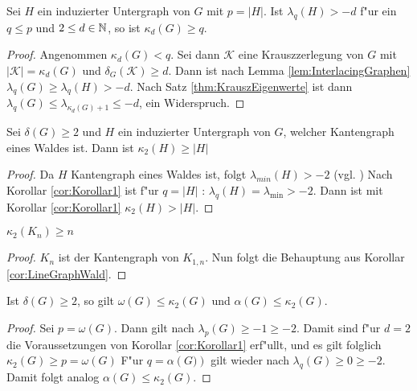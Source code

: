 \begin{corollary}
  \label{cor:Korollar1}
  Sei $H$ ein induzierter Untergraph von $G$ mit $p = \left| H\right|$.
  Ist $\lambda_q (H) > -d $ f"ur ein $q \leq p$ und $2 \leq d \in {\mathbb{N}}$, so ist $\kappa_d(G) \geq q$.
\end{corollary}
\begin{proof}
  Angenommen $\kappa_{d}(G) < q$. Sei dann $\mathcal{K}$ eine Krauszzerlegung von $G$ mit $|\mathcal{K}| = \kappa_{d}(G)$ und $\delta_G(\mathcal{K}) \geq d$. Dann ist nach Lemma \ref{lem:InterlacingGraphen} $\lambda_{q}(G) \geq \lambda_{q}(H) > -d $. Nach Satz \ref{thm:KrauszEigenwerte} ist dann $\lambda_{q}(G) \leq \lambda_{\kappa_{d}(G)+1} \leq -d $, ein Widerspruch. 
\end{proof}

\begin{corollary}
  \label{cor:LineGraphWald}
  Sei $\delta(G) \geq 2$ und $H$ ein induzierter Untergraph von $G$, welcher Kantengraph eines Waldes ist. 
  Dann ist $\kappa_{2}(H)\geq \left|H\right|$
\end{corollary}

\begin{proof}
  Da $H$ Kantengraph eines Waldes ist, folgt $\lambda_{min}(H) > -2$ (vgl. \cite[3.4.10]{zbMATH05625877}) 
  Nach Korollar \ref{cor:Korollar1} ist f"ur $q=\left|H\right|$ : $\lambda_q(H)=\lambda_{\text{min}}> -2$. Dann ist mit Korollar \ref{cor:Korollar1} $\kappa_{2}\left( H \right) > \left| H\right|$.
\end{proof}

\begin{corollary}[Klotz]
  $\kappa_{2}\left( K_n \right) \geq n$
\end{corollary}

\begin{proof}
  $K_n$ ist der Kantengraph von $K_{1,n}$. Nun folgt die Behauptung aus Korollar \ref{cor:LineGraphWald}.
\end{proof}
\begin{corollary}
  Ist $\delta\left( G \right) \geq 2$, so gilt $\omega\left( G \right)\leq \kappa_{2}\left( G \right)$ und $\alpha\left( G \right)\leq \kappa_{2}\left( G \right)$.
  \label{cor:alphaomegakrausz}
\end{corollary}

\begin{proof}
  Sei $p = \omega(G)$. Dann gilt nach $\lambda_{p}\left( G \right)\geq -1\geq -2$. Damit sind f"ur $d=2$ die Voraussetzungen von Korollar \ref{cor:Korollar1} erf"ullt, und es gilt folglich $\kappa_{2}\left( G \right)\geq p = \omega\left( G \right)$ 
  F"ur $q=\alpha\left( G) \right)$ gilt wieder nach $\lambda_{q}\left( G \right)\geq 0 \geq -2$. Damit folgt analog $\alpha\left( G \right) \leq \kappa_{2}\left( G \right)$.
\end{proof}

